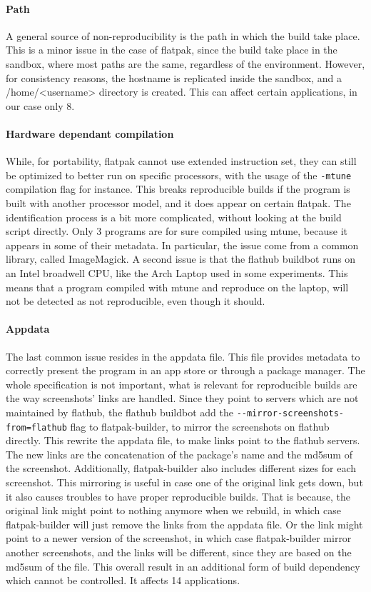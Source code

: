 \documentclass[a4paper,11pt,oneside]{report}
\theoremstyle{definition}
\newcommand{\rb}{reproducible builds\xspace}
\newcommand{\fp}{flatpak\xspace}
\newcommand{\fh}{flathub\xspace}
\newcommand{\fb}{flatpak-builder\xspace}
\newcommand{\fhbb}{flathub buildbot\xspace}
\begin{document}
\paragraph*{Path}
A general source of non-reproducibility is the path in which the build take
place. This is a minor issue in the case of \fp, since the build take
place in the sandbox, where most paths are the same, regardless of the
environment. However, for consistency reasons, the hostname is replicated
inside the sandbox, and a /home/<username> directory is created. This can
affect certain applications, in our case only 8.

\paragraph*{Hardware dependant compilation}
While, for portability, \fp cannot use extended instruction set, they can still
be optimized to better run on specific processors, with the usage of the
\verb|-mtune| compilation flag for instance. This breaks \rb if the program is
built with another processor model, and it does appear on certain \fp. The
identification process is a bit more complicated, without looking at the build
script directly. Only 3 programs are for sure compiled using mtune, because it
appears in some of their metadata. In particular, the issue come from a common
library, called ImageMagick. A second issue is that the \fhbb runs on an Intel
broadwell CPU, like the Arch Laptop used in some experiments. This means that a
program compiled with mtune and reproduce on the laptop, will not be detected
as not reproducible, even though it should.

\paragraph*{Appdata}
The last common issue resides in the appdata file. This file provides metadata
to correctly present the program in an app store or through a package manager.
The whole specification is not important, what is relevant for \rb are the way
screenshots' links are handled. Since they point to servers which are not
maintained by \fh, the \fhbb add the \verb|--mirror-screenshots-from=flathub|
flag to \fb, to mirror the screenshots on \fh directly. This rewrite the
appdata file, to make links point to the \fh servers. The new links are the
concatenation of the package's name and the md5sum of the screenshot.
Additionally, \fb also includes different sizes for each screenshot. This
mirroring is useful in case one of the original link gets down, but it also
causes troubles to have proper \rb. That is because, the original link might
point to nothing anymore when we rebuild, in which case \fb will just remove
the links from the appdata file. Or the link might point to a newer version of
the screenshot, in which case \fb mirror another screenshots, and the links
will be different, since they are based on the md5sum of the file. This overall
result in an additional form of build dependency which cannot be controlled.
It affects 14 applications.
\end{document}
